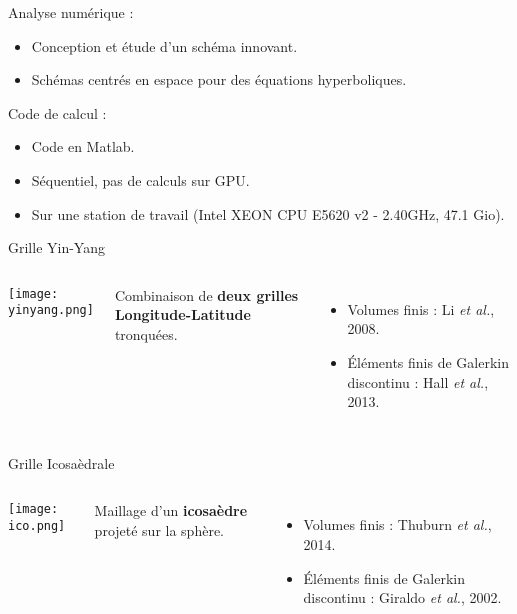 \documentclass[11pt]{beamer}
\begin{document}
\begin{frame}{}
\begin{block}{Analyse numérique :}
\begin{itemize}
\item Conception et étude d'un schéma innovant.
\item Schémas centrés en espace pour des équations hyperboliques.
\end{itemize}
\end{block}

\begin{block}{Code de calcul :}
\begin{itemize}
\item Code en Matlab.
\item Séquentiel, pas de calculs sur GPU.
\item Sur une station de travail (Intel XEON CPU E5620 v2 - 2.40GHz, 47.1 Gio).
\end{itemize}
\end{block}
\end{frame}







\begin{frame}{Grille Yin-Yang}
\begin{columns}
\begin{center}
\texttt{[image: yinyang.png]}
\end{center}

Combinaison de \textbf{deux grilles Longitude-Latitude} tronquées.

\begin{itemize}
\item Volumes finis : Li \textit{et al.}, 2008.
\item Éléments finis de Galerkin discontinu : Hall \textit{et al.}, 2013.
\end{itemize}
\end{columns}
\end{frame}



\begin{frame}{Grille Icosaèdrale}
\begin{columns}
\begin{center}
\texttt{[image: ico.png]}
\end{center}

Maillage d'un \textbf{icosaèdre} projeté sur la sphère.

\begin{itemize}
\item Volumes finis : Thuburn \textit{et al.}, 2014.
\item Éléments finis de Galerkin discontinu : Giraldo \textit{et al.}, 2002.
\end{itemize}
\end{columns}
\end{frame}
\end{document}
